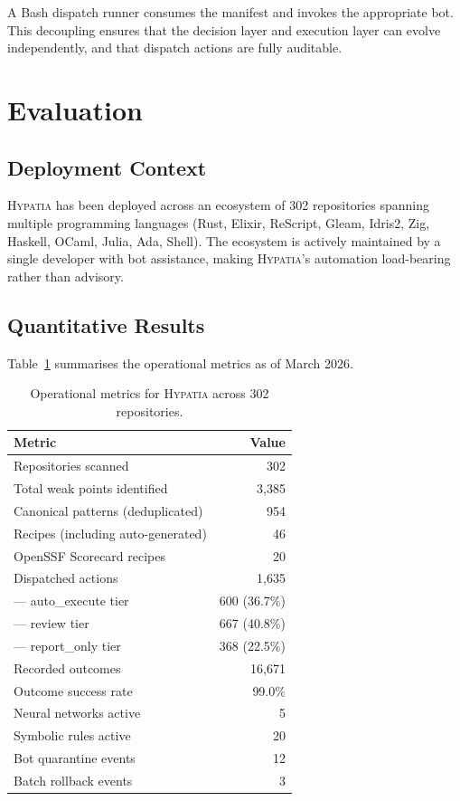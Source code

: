 \documentclass[11pt,a4paper]{article}
\begin{document}
A Bash dispatch runner consumes the manifest and invokes the appropriate bot. This decoupling ensures that the decision layer and execution layer can evolve independently, and that dispatch actions are fully auditable.


\section{Evaluation}
\label{sec:evaluation}

\subsection{Deployment Context}

\textsc{Hypatia} has been deployed across an ecosystem of 302 repositories spanning multiple programming languages (Rust, Elixir, ReScript, Gleam, Idris2, Zig, Haskell, OCaml, Julia, Ada, Shell). The ecosystem is actively maintained by a single developer with bot assistance, making \textsc{Hypatia}'s automation load-bearing rather than advisory.

\subsection{Quantitative Results}

Table~\ref{tab:metrics} summarises the operational metrics as of March 2026.

\begin{table}[htbp]
\centering
\caption{Operational metrics for \textsc{Hypatia} across 302 repositories.}
\label{tab:metrics}
\begin{tabular}{@{}lr@{}}
\toprule
\textbf{Metric} & \textbf{Value} \\
\midrule
Repositories scanned & 302 \\
Total weak points identified & 3{,}385 \\
Canonical patterns (deduplicated) & 954 \\
Recipes (including auto-generated) & 46 \\
OpenSSF Scorecard recipes & 20 \\
Dispatched actions & 1{,}635 \\
\quad --- auto\_execute tier & 600 (36.7\%) \\
\quad --- review tier & 667 (40.8\%) \\
\quad --- report\_only tier & 368 (22.5\%) \\
Recorded outcomes & 16{,}671 \\
Outcome success rate & 99.0\% \\
Neural networks active & 5 \\
Symbolic rules active & 20 \\
Bot quarantine events & 12 \\
Batch rollback events & 3 \\
\bottomrule
\end{tabular}
\end{table}
\end{document}
